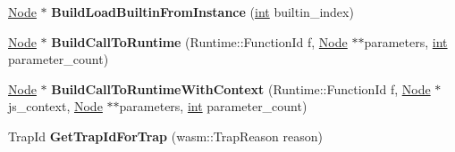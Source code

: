 \begin{DoxyCompactItemize}
\mbox{\hyperlink{classv8_1_1internal_1_1compiler_1_1Node}{Node}} $\ast$ {\bfseries Build\+Load\+Builtin\+From\+Instance} (\mbox{\hyperlink{classint}{int}} builtin\+\_\+index)
\item 
\mbox{\label{classv8_1_1internal_1_1compiler_1_1WasmGraphBuilder_a6ba66e3fc39efb6f8906cfee0e3d2eff}} 
\mbox{\hyperlink{classv8_1_1internal_1_1compiler_1_1Node}{Node}} $\ast$ {\bfseries Build\+Call\+To\+Runtime} (Runtime\+::\+Function\+Id f, \mbox{\hyperlink{classv8_1_1internal_1_1compiler_1_1Node}{Node}} $\ast$$\ast$parameters, \mbox{\hyperlink{classint}{int}} parameter\+\_\+count)
\item 
\mbox{\label{classv8_1_1internal_1_1compiler_1_1WasmGraphBuilder_ae1577de218eab780abfbf3c7f0bf0bf6}} 
\mbox{\hyperlink{classv8_1_1internal_1_1compiler_1_1Node}{Node}} $\ast$ {\bfseries Build\+Call\+To\+Runtime\+With\+Context} (Runtime\+::\+Function\+Id f, \mbox{\hyperlink{classv8_1_1internal_1_1compiler_1_1Node}{Node}} $\ast$js\+\_\+context, \mbox{\hyperlink{classv8_1_1internal_1_1compiler_1_1Node}{Node}} $\ast$$\ast$parameters, \mbox{\hyperlink{classint}{int}} parameter\+\_\+count)
\item 
\mbox{\label{classv8_1_1internal_1_1compiler_1_1WasmGraphBuilder_abc0303614adafbd68f2b94fbb64faf8b}} 
Trap\+Id {\bfseries Get\+Trap\+Id\+For\+Trap} (wasm\+::\+Trap\+Reason reason)
\end{DoxyCompactItemize}
